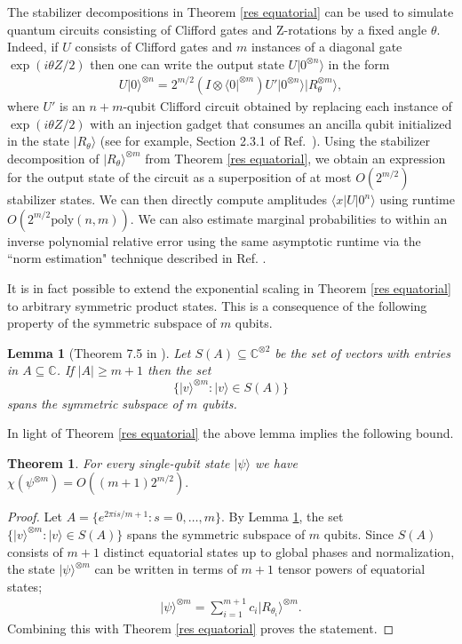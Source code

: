 \documentclass[a4paper,onecolumn,11pt,accepted=2021-11-11]{quantumarticle}
\newtheorem{theorem}{Theorem}
\newtheorem{lem}{Lemma}
\newcommand{\bb}{\mathbb}
\newcommand{\ket}[1]{\ensuremath{\lvert #1 \rangle}}
\newcommand{\bra}[1]{\ensuremath{\langle #1 \rvert}}
\begin{document}
The stabilizer decompositions in Theorem \ref{res equatorial} can be used to simulate quantum circuits consisting of Clifford gates and Z-rotations by a fixed angle $\theta$. Indeed,  if $U$ consists of Clifford gates and $m$ instances of a diagonal gate $\exp\left(i \theta Z/2\right)$ then one can write the output state $U\ket{0^{\otimes n}}$ in the form
\begin{align}
U \ket{0}^{\otimes n} = 2^{m/2} \left( I \otimes \bra{0}^{\otimes m} \right) U' \ket{0^{\otimes n}}\ket{R_\theta^{\otimes m}}, 
\end{align}
where $U'$ is an $n+m$-qubit Clifford circuit obtained by replacing each instance of $\exp\left(i \theta Z/2\right)$ with an injection gadget that consumes an ancilla qubit initialized in the state $\ket{R_\theta}$ (see for example, Section 2.3.1 of Ref.~\cite{bravyi2018simulation}). Using the stabilizer decomposition of $\ket{R_\theta}^{\otimes m}$ from Theorem \ref{res equatorial}, we obtain an expression for the output state of the circuit as a superposition of at most $O(2^{m/2})$ stabilizer states. We can then directly compute amplitudes $\langle x|U|0^n\rangle$ using runtime $O(2^{m/2} \text{poly}(n,m))$. We can also estimate marginal probabilities to within an inverse polynomial relative error using the same asymptotic runtime via the ``norm estimation" technique described in Ref. \cite{bravyi2016improved}.

It is in fact possible to extend the exponential scaling in Theorem \ref{res equatorial} to arbitrary symmetric product states. This is a consequence of the following property of the symmetric subspace of $m$ qubits.

\begin{lem}[Theorem 7.5 in \cite{watrous2018theory}]\label{watrous lemma}
Let $S(A) \subseteq \bb{C}^{\otimes 2}$ be the set of vectors with entries in $A \subseteq \bb{C}$. If $|A| \geq m+1$ then the set
$$\{ \ket{v}^{\otimes m} : \ket{v} \in S(A) \}$$ spans the symmetric subspace of $m$ qubits.
\end{lem}
In light of Theorem \ref{res equatorial} the above lemma implies the following bound.
\begin{theorem}\label{res general}
For every single-qubit state $\ket{\psi}$ we have
$
\chi(\psi^{\otimes m}) = O\left( (m+1)2^{m/2} \right).
$
\end{theorem}
\begin{proof}
Let $A = \{e^{2\pi i s /m+1}: s =0, \dots, m\}$. By Lemma \ref{watrous lemma}, the set $ \{ \ket{v}^{\otimes m} : \ket{v} \in S(A) \} $ spans the symmetric subspace of $m$ qubits. Since $S(A)$ consists of $m+1$ distinct equatorial states up to global phases and normalization, the state $\ket{\psi}^{\otimes m}$ can be written in terms of $m+1$ tensor powers of equatorial states;
\begin{align}
\ket{\psi}^{\otimes m} = \sum_{i = 1}^{m+1} c_i \ket{R_{\theta_i}}^{\otimes m}.
\end{align}
Combining this with Theorem \ref{res equatorial} proves the statement.
\end{proof}
\end{document}
